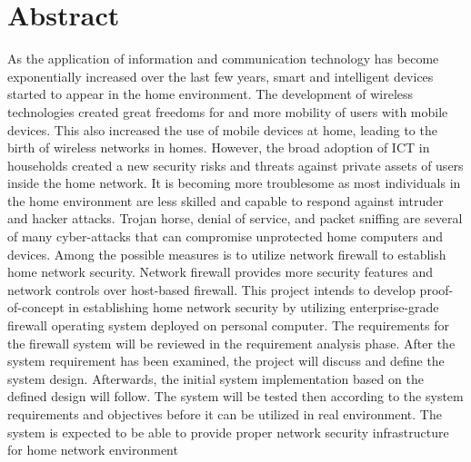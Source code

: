 \documentclass[../index.tex]{subfiles}
\begin{document}
\clearpage
\chapter*{Abstract}

As the application of information and communication technology has become exponentially increased
over the last few years, smart and intelligent devices started to appear in the home environment.
The development of wireless technologies created great freedoms for and more mobility of users with
mobile devices. This also increased the use of mobile devices at home, leading to the birth of
wireless networks in homes. However, the broad adoption of ICT in households created a new security
risks and threats against private assets of users inside the home network. It is becoming more
troublesome as most individuals in the home environment are less skilled and capable to respond
against intruder and hacker attacks. Trojan horse, denial of service, and packet sniffing are
several of many cyber-attacks that can compromise unprotected home computers and devices. Among the
possible measures is to utilize network firewall to establish home network security. Network
firewall provides more security features and network controls over host-based firewall. This project
intends to develop proof-of-concept in establishing home network security by utilizing
enterprise-grade firewall operating system deployed on personal computer. The requirements for the
firewall system will be reviewed in the requirement analysis phase. After the system requirement has
been examined, the project will discuss and define the system design. Afterwards, the initial system
implementation based on the defined design will follow. The system will be tested then according to
the system requirements and objectives before it can be utilized in real environment. The system is
expected to be able to provide proper network security infrastructure for home network environment

\clearpage
\end{document}
